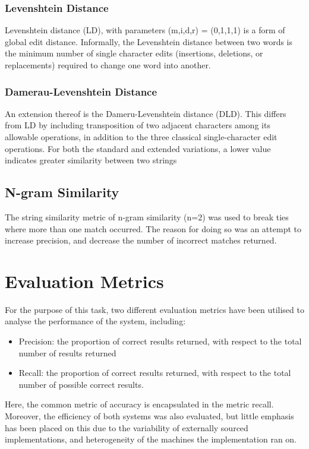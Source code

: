 \documentclass[11pt]{article}
\begin{document}
\subsubsection{Levenshtein Distance}
Levenshtein distance (LD), with parameters (m,i,d,r) = (0,1,1,1) is a form of global edit distance. Informally, the Levenshtein distance between two words is the minimum number of single character edits (insertions, deletions, or replacements) required to change one word into another. 

\subsubsection{Damerau-Levenshtein Distance}
An extension thereof is the Dameru-Levenshtein distance (DLD). This differs from LD by including transposition of two adjacent characters among its allowable operations, in addition to the three classical  single-character edit operations. For both the standard and extended variations, a lower value indicates greater similarity between two strings

\subsection{N-gram Similarity}
The string similarity metric of n-gram similarity (n=2) was used to break ties where more than one match occurred. The reason for doing so was an attempt to increase precision, and decrease the number of incorrect matches returned.


\section{Evaluation Metrics}
For the purpose of this task, two different evaluation metrics have been utilised to analyse the performance of the system, including:
\begin{itemize}
\item Precision: the proportion of correct results returned, with respect to the total number of results returned
\item Recall: the proportion of correct results returned, with respect to the total number of possible correct results.
\end{itemize}
Here, the common metric of accuracy is encapsulated in the metric recall.
Moreover, the efficiency of both systems was also evaluated, but little emphasis has been placed on this
due to the variability of externally sourced implementations, and heterogeneity of the machines the implementation ran on.
\end{document}
